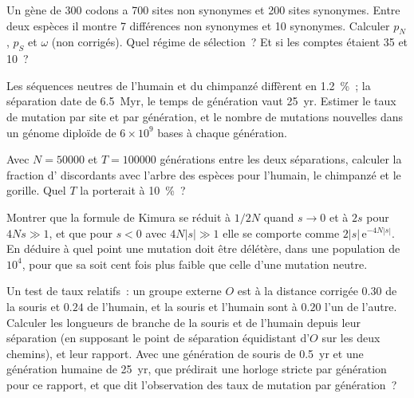 \begin{exercise}[$\star\star$]\label{exo:b3:molecular-evolution:7}
Un gène de 300 codons a 700 sites non synonymes et 200 sites synonymes.
Entre deux espèces il montre 7 différences non synonymes et 10
synonymes. Calculer $p_{N}$, $p_{S}$ et $\omega$ (non corrigés). Quel
régime de sélection~? Et si les comptes étaient 35 et 10~?
\end{exercise}

\begin{exercise}[$\star\star$]\label{exo:b3:molecular-evolution:8}
Les séquences neutres de l'humain et du chimpanzé diffèrent en
\qty{1.2}{\%}~; la séparation date de \qty{6.5}{Myr}, le temps de
génération vaut \qty{25}{yr}. Estimer le taux de mutation par site et
par génération, et le nombre de mutations nouvelles dans un génome
diploïde de $6\times 10^{9}$ bases à chaque génération.
\end{exercise}

\begin{exercise}[$\star\star$]\label{exo:b3:molecular-evolution:9}
Avec $N = \num{50000}$ et $T = \num{100000}$ générations entre les deux
séparations, calculer la fraction d' discordants avec
l'arbre des espèces pour l'humain, le chimpanzé et le gorille. Quel $T$
la porterait à \qty{10}{\%}~?
\end{exercise}

\begin{exercise}[$\star\star\star$]\label{exo:b3:molecular-evolution:10}
Montrer que la formule de Kimura se réduit à $1/2N$ quand $s \to 0$ et à
$2s$ pour $4Ns \gg 1$, et que pour $s < 0$ avec $4N|s| \gg 1$ elle se
comporte comme $2|s|\,\mathrm{e}^{-4N|s|}$. En déduire à quel point une
mutation doit être délétère, dans une population de $10^{4}$, pour que
sa  soit cent fois plus faible que celle d'une
mutation neutre.
\end{exercise}

\begin{exercise}[$\star\star\star$]\label{exo:b3:molecular-evolution:11}
Un test de taux relatifs~: un groupe externe $O$ est à la distance
corrigée $0.30$ de la souris et $0.24$ de l'humain, et la souris et
l'humain sont à $0.20$ l'un de l'autre. Calculer les longueurs de
branche de la souris et de l'humain depuis leur séparation (en supposant
le point de séparation équidistant d'$O$ sur les deux chemins), et leur
rapport. Avec une génération de souris de \qty{0.5}{yr} et une
génération humaine de \qty{25}{yr}, que prédirait une horloge stricte
par génération pour ce rapport, et que dit l'observation des taux de
mutation par génération~?
\end{exercise}

